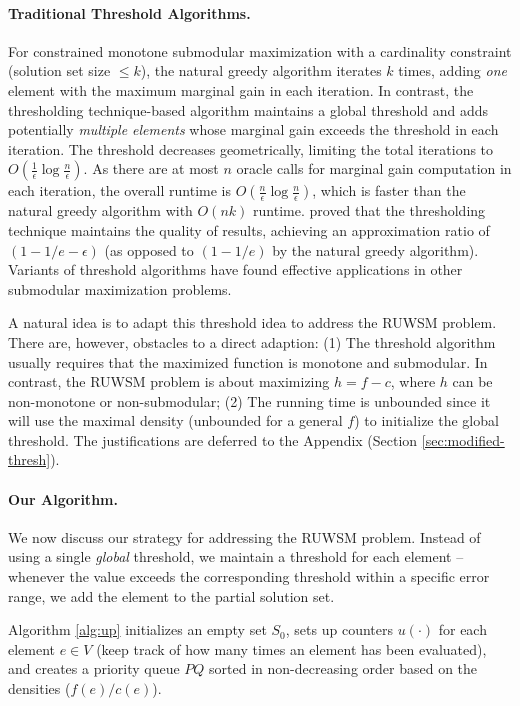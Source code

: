 \documentclass[10pt]{article} %
\theoremstyle{remark}
\begin{document}
\paragraph{\bf Traditional Threshold Algorithms.} 
For constrained monotone submodular maximization with a cardinality constraint (solution set size $\leq k$), the natural greedy algorithm iterates $k$ times, adding \emph{one} element with the maximum marginal gain in each iteration. In contrast, the thresholding technique-based algorithm maintains a global threshold and adds potentially \emph{multiple elements} whose marginal gain exceeds the threshold in each iteration. The threshold decreases geometrically, limiting the total iterations to $O(\frac{1}{\epsilon}\log\frac{n}{\epsilon})$. As there are at most $n$ oracle calls for marginal gain computation in each iteration, the overall runtime is $O(\frac{n}{\epsilon}\log\frac{n}{\epsilon})$, which is faster than the natural greedy algorithm with $O(nk)$ runtime. \citet{badanidiyuru2014fast} proved that the thresholding technique maintains the quality of results, achieving an approximation ratio of $(1-1/e-\epsilon)$ (as opposed to $(1-1/e)$ by the natural greedy algorithm). Variants of threshold algorithms \cite{ene2017nearly,amanatidis2020fast} have found effective applications in other submodular maximization problems.

A natural idea is to adapt this threshold idea to address the RUWSM problem. There are, however, obstacles to a direct adaption: (1)
The threshold algorithm usually requires that the maximized function is monotone and submodular. In contrast, the RUWSM problem is about maximizing $h=f-c$, where $h$ can be non-monotone or non-submodular;
(2) The running time is unbounded since it will use the maximal density (unbounded for a general $f$) to initialize the global threshold. The justifications are deferred to the Appendix (Section \ref{sec:modified-thresh}).


\paragraph{\bf Our Algorithm.} 
We now discuss our strategy for addressing the RUWSM problem. Instead of using a single \textit{global} threshold, we maintain a threshold for each element -- whenever the value exceeds the corresponding threshold within a specific error range, we add the element to the partial solution set. 

Algorithm \ref{alg:up} initializes an empty set $S_0$, sets up counters $u(\cdot)$ for each element $e \in V$ (keep track of how many times an element has been evaluated), and creates a priority queue $PQ$ sorted in non-decreasing order based on the densities ($f(e)/c(e)$). 
\end{document}
